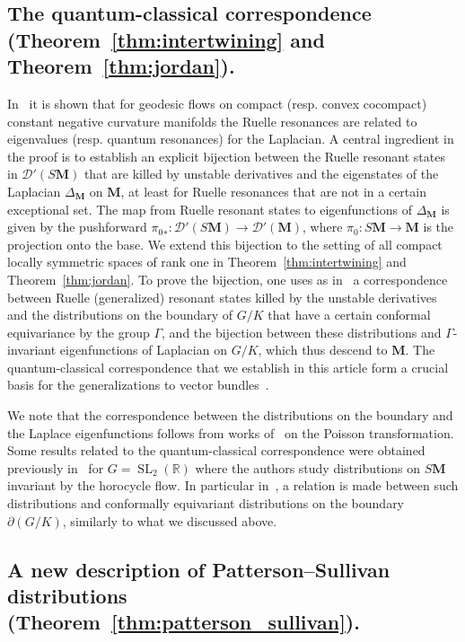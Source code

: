 \documentclass[10pt]{amsart}
\theoremstyle{definition}
\DeclareMathOperator{\SL}{SL}
\newcommand{\mc}{\mathcal}
\newcommand{\rr}{\mathbb{R}}
\newcommand{\bfm}{\mathbf{M}}
\newcommand{\pl}{\partial}
\begin{document}
\subsection{The quantum-classical correspondence (Theorem~\ref{thm:intertwining} and Theorem~\ref{thm:jordan}).}
In~\cite{DFG15,GHW18,Had18} it is shown that for geodesic flows on compact (resp. convex cocompact) constant negative curvature manifolds the Ruelle resonances are related to eigenvalues (resp. quantum resonances) for the Laplacian. A central ingredient in the proof is to establish an explicit bijection between the Ruelle resonant states in $\mathcal D'(S\mathbf M)$ that are killed by unstable derivatives and the eigenstates of the Laplacian $\Delta_{\bfm}$ on $\mathbf M$, at least for Ruelle resonances that are not in a certain exceptional set. The map from Ruelle resonant states to eigenfunctions of $\Delta_{\bfm}$ is given by the pushforward ${\pi_0}_*:\mc{D}'(S\bfm)\to \mc{D}'(\bfm)$, where $\pi_0:S{\bfm}\to {\bfm}$ is the projection onto the base. We extend this bijection to the setting of all compact locally symmetric spaces of rank one in Theorem~\ref{thm:intertwining} and Theorem~\ref{thm:jordan}. To prove the bijection, one uses as in~\cite{DFG15} a correspondence between Ruelle (generalized) resonant states killed by the unstable derivatives and the distributions on the boundary of $G/K$ that have a certain conformal equivariance by the group $\Gamma$, and the bijection between these distributions and $\Gamma$-invariant eigenfunctions of Laplacian on $G/K$, which thus descend to $\bfm$. The quantum-classical correspondence that we establish in this article form a crucial basis for the generalizations to vector bundles~\cite{KW19b,KW19a}.

We note that the correspondence between the distributions on the boundary and the Laplace eigenfunctions follows from works of~\cite{vBS87,GO05,He74,OS80,Ot98} on the Poisson transformation. Some results related to the quantum-classical correspondence were obtained previously in~\cite{Co05,FF03} for $G={\SL}_2(\rr)$ where the authors study distributions on $S\mathbf{M}$ invariant by the horocycle flow. In particular in~\cite{Co05}, a relation is made between such distributions and conformally equivariant distributions on the boundary $\pl(G/K)$, similarly to what we discussed above.

\subsection{A new description of Patterson--Sullivan distributions (Theorem~\ref{thm:patterson_sullivan}).}
\end{document}
